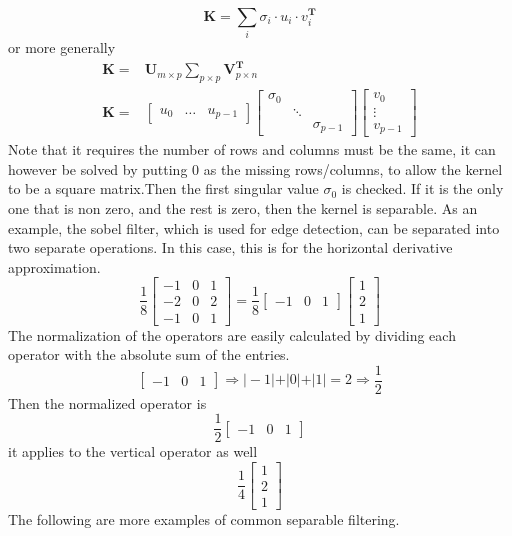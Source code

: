 \documentclass[twoside,a4paper,article]{combine}
\begin{document}
\[        
    \boldsymbol{K} = \sum_{i}{\sigma_i \cdot u_i \cdot v_i^{\boldsymbol{T}}} 
\]
or more generally
\begin{align*}
        \boldsymbol{K} =& \textbf{U}_{m\times p} \boldsymbol{\textstyle\sum}_{p\times p} \textbf{V}_{p\times n}^{\boldsymbol{T}} \\
        \boldsymbol{K} =& \begin{bmatrix}
            u_0 & \hdots & u_{p-1}
        \end{bmatrix}
        \begin{bmatrix}
            \sigma_0&&\\
            &\ddots&\\
            &&\sigma_{p-1}
        \end{bmatrix}
        \begin{bmatrix}
            v_0 \\
            \vdots \\
            v_{p-1}
        \end{bmatrix}
\end{align*}
Note that it requires the number of rows and columns must be the same, it can however be solved by putting 0 as the missing rows/columns,
to allow the kernel to be a square matrix.Then the first singular value $\sigma_0$ is checked. If it is the only one that is non zero,
and the rest is zero, then the kernel is separable. As an example, the sobel filter, which is used for edge detection, 
can be separated into two separate operations. In this case, this is for the horizontal derivative approximation. \cite{CHANG2023160}
\[
    \frac{1}{8}
    \begin{bmatrix}
        -1 & 0 & 1 \\
        -2 & 0 & 2 \\
        -1 & 0 & 1
    \end{bmatrix}
    =
    \frac{1}{8}
    \begin{bmatrix} -1 & 0 & 1 \end{bmatrix}
    \begin{bmatrix} 1 \\ 2 \\ 1 \end{bmatrix}
\]
The normalization of the operators are easily calculated by dividing each operator with the absolute sum of the entries.
\[  
    \begin{bmatrix} -1 & 0 & 1 \end{bmatrix} \Rightarrow \vert -1 \vert + \vert 0 \vert + \vert 1 \vert = 2 \Rightarrow \frac{1}{2}
\]
Then the normalized operator is
\[
    \frac{1}{2} \begin{bmatrix} -1 & 0 & 1 \end{bmatrix}
\]
it applies to the vertical operator as well
\[
    \frac{1}{4} \begin{bmatrix} 1 \\ 2 \\ 1 \end{bmatrix}
\]
The following are more examples of common separable filtering.
\end{document}
